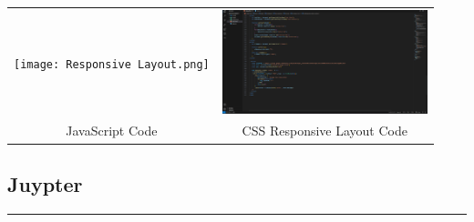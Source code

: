 \documentclass[12pt, A4]{report}
\begin{document}
\begin{tabular}{cc}
  \texttt{[image: Responsive Layout.png]}
  &
  \includegraphics[width=225,height=0.20\textheight]{JS code.png}
   \\  
  JavaScript Code & CSS Responsive Layout Code
   
 \end{tabular}

\vspace{5mm}
\subsection{Juypter}
\rule{\textwidth}{0.1pt}
\end{document}
